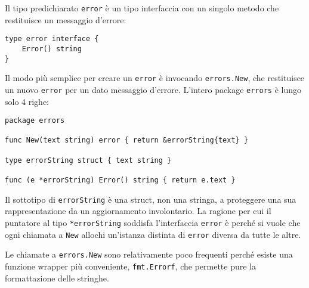 Il tipo predichiarato \verb|error| è un tipo interfaccia con un singolo metodo che restituisce un messaggio d'errore:
\begin{lstlisting}[frame=single, label={lst:lstlisting6-6.1}]
type error interface {
    Error() string
}
\end{lstlisting}
Il modo più semplice per creare un \verb|error| è invocando \verb|errors.New|, che restituisce un nuovo \verb|error| per un dato messaggio d'errore.
L'intero package \verb|errors| è lungo solo 4 righe:
\begin{lstlisting}[frame=single, label={lst:lstlisting6-6.2}]
package errors

func New(text string) error { return &errorString{text} }

type errorString struct { text string }

func (e *errorString) Error() string { return e.text }
\end{lstlisting}
Il sottotipo di \verb|errorString| è una struct, non una stringa, a proteggere una sua rappresentazione da un aggiornamento involontario.
La ragione per cui il puntatore al tipo \verb|*errorString| soddisfa l'interfaccia \verb|error| è perché si vuole che ogni chiamata a \verb|New| allochi un'istanza distinta di \verb|error| diversa da tutte le altre.

Le chiamate a \verb|errors.New| sono relativamente poco frequenti perché esiste una funzione wrapper più conveniente, \verb|fmt.Errorf|, che permette pure la formattazione delle stringhe.